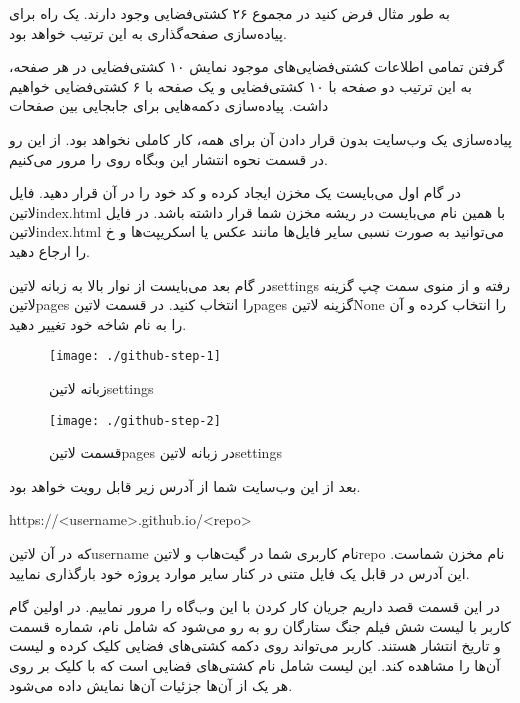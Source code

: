 به طور مثال فرض کنید در مجموع ۲۶ کشتی‌فضایی وجود دارند. یک راه برای پیاده‌سازی صفحه‌گذاری به این ترتیب خواهد بود.

 گرفتن تمامی اطلاعات کشتی‌فضایی‌های موجود
 نمایش ۱۰ کشتی‌فضایی در هر صفحه، به این ترتیب دو صفحه با ۱۰ کشتی‌فضایی و یک صفحه با ۶ کشتی‌فضایی خواهیم داشت.
 پیاده‌سازی دکمه‌هایی برای جابجایی بین صفحات

پیاده‌سازی یک وب‌سایت بدون قرار دادن آن برای همه، کار کاملی نخواهد بود. از این رو در قسمت نحوه انتشار این وبگاه روی  را مرور می‌کنیم.

در گام اول می‌بایست یک مخزن ایجاد کرده و کد خود را در آن قرار دهید. فایل ‌لاتین{index.html} با همین نام می‌بایست در ریشه مخزن شما قرار داشته باشد.
در فایل ‌لاتین{index.html} می‌توانید به صورت نسبی سایر فایل‌ها مانند عکس یا اسکریپت‌ها و ‌خ را ارجاع دهید.

در گام بعد می‌بایست از نوار بالا به زبانه ‌لاتین{settings} رفته و از منوی سمت چپ گزینه ‌لاتین{pages} را انتخاب کنید.
در قسمت ‌لاتین{pages} گزینه ‌لاتین{None} را انتخاب کرده و آن را به نام شاخه خود تغییر دهید.

\begin{figure}[h]
  \centering
  \texttt{[image: ./github-step-1]}
  \caption{زبانه ‌لاتین{settings}}
\end{figure}

\begin{figure}[h]
  \centering
  \texttt{[image: ./github-step-2]}
  \caption{قسمت ‌لاتین{pages} در زبانه ‌لاتین{settings}}
\end{figure}

بعد از این وب‌سایت شما از آدرس زیر قابل رویت خواهد بود.

\begin{latin}\begin{center}
https://<username>.github.io/<repo>
\end{center}\end{latin}

که در آن ‌لاتین{username} نام کاربری شما در گیت‌هاب و ‌لاتین{repo} نام مخزن شماست. این آدرس در قابل یک فایل متنی در کنار سایر موارد پروژه خود بارگذاری نمایید.


در این قسمت قصد داریم جریان کار کردن با این وب‌گاه را مرور نماییم.
در اولین گام کاربر با لیست شش فیلم جنگ ستارگان رو به رو می‌شود که شامل
نام، شماره قسمت و تاریخ انتشار هستند.
کاربر می‌تواند روی دکمه کشتی‌های فضایی کلیک کرده و لیست آن‌ها را مشاهده کند.
این لیست شامل نام کشتی‌های فضایی است که با کلیک بر روی هر یک از آن‌ها
جزئیات آن‌ها نمایش داده می‌شود.

